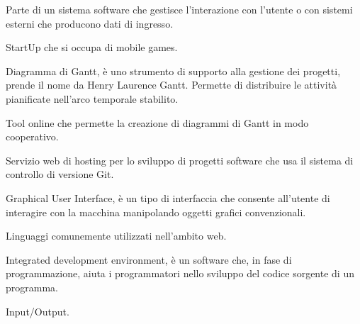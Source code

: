 
Parte di un sistema software che gestisce l'interazione con l'utente o con sistemi esterni che producono dati di ingresso. \\


StartUp che si occupa di mobile games. \\




Diagramma di Gantt, è uno strumento di supporto alla gestione dei progetti, prende il nome da Henry Laurence Gantt.
Permette di distribuire le attività pianificate nell'arco temporale stabilito. \\


Tool online che permette la creazione di diagrammi di Gantt in modo cooperativo. \\


Servizio web di hosting per lo sviluppo di progetti software che usa il sistema di controllo di versione Git. \\


Graphical User Interface, è un tipo di interfaccia che consente all'utente di interagire con la macchina manipolando oggetti grafici convenzionali. \\



Linguaggi comunemente utilizzati nell'ambito web. \\



Integrated development environment,  è un software che, in fase di programmazione, aiuta i programmatori nello sviluppo del codice sorgente di un programma. \\


Input/Output. \\



